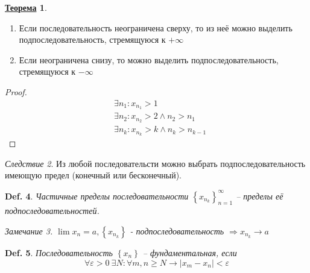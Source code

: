 \documentclass[12pt]{article}
\newenvironment{MyList}[1][4pt]{
  \begin{enumerate}[1.]
  \setlength{\parskip}{0pt}
  \setlength{\itemsep}{#1}
}{       
  \end{enumerate}
}
\def\SO{\Rightarrow}     %
\def\Pagebreak{\pagebreak\vspace*{-1.5em}}
\theoremstyle{definition} %
\newtheorem{Thm}{\underline{Теорема}}[subsection] %
\theoremstyle{plain} %
\newtheorem{Def}[Thm]{Def.} %
\theoremstyle{remark} %
\newtheorem{Cons}[Thm]{Следствие} %
\newtheorem{Rem}[Thm]{Замечание} %
\begin{document}
\begin{Thm}
    \begin{MyList}
        \item Если последовательность неограничена сверху, то из неё можно выделить подпоследовательность, стремящуюся к $+\infty$ 
        \item Если неограничена снизу, то можно выделить подпоследовательность, стремящуюся к $-\infty$ 
    \end{MyList}
\end{Thm}

\begin{proof}
    \begin{align*}
        &\exists n_1 : x_{n_1} > 1 \\
        &\exists n_2 : x_{n_2} > 2 \wedge n_2 > n_1 \\
        &\exists n_k : x_{n_k} > k \wedge n_k > n_{k - 1}
    \end{align*} 
\end{proof}

\Pagebreak
\begin{Cons}
    Из любой последовательсти можно выбрать подпоследовательность имеющую предел (конечный или бесконечный).
\end{Cons}

\begin{Def}
    Частичные пределы последовательности $\left\{x_{n_k}\right\}_{n = 1}^\infty$ -- пределы её подпоследовательностей.
    
    \begin{Rem}
        $\lim x_n = a, \left\{x_{n_k}\right\}$ - подпоследовательность $\SO x_{n_k} \to a$ 
    \end{Rem}
\end{Def}

\begin{Def}
    Последовательность $\left\{x_n\right\}$ -- фундаментальная, если 
    \[\forall \varepsilon > 0 \ \exists N : \forall m, n \geqslant N \to |x_m - x_n| < \varepsilon\]
\end{Def}
\end{document}
